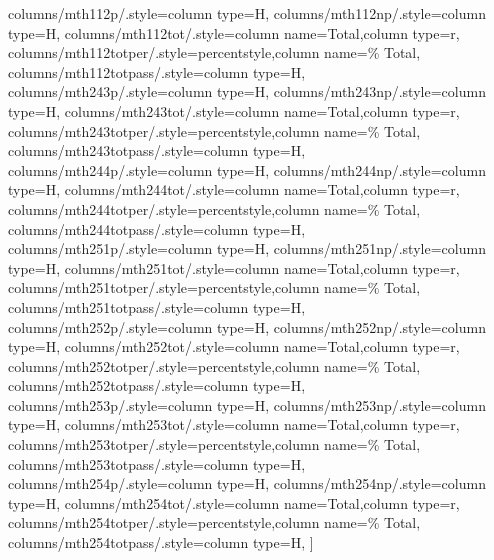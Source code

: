 \documentclass{article}
\begin{document}
{    %
    columns/mth112p/.style={column type=H},
    columns/mth112np/.style={column type=H},
    columns/mth112tot/.style={column name=Total,column type=r},
    columns/mth112totper/.style={percentstyle,column name=\% Total},
    columns/mth112totpass/.style={column type=H},
    columns/mth243p/.style={column type=H},
    columns/mth243np/.style={column type=H},
    columns/mth243tot/.style={column name=Total,column type=r},
    columns/mth243totper/.style={percentstyle,column name=\% Total},
    columns/mth243totpass/.style={column type=H},
    columns/mth244p/.style={column type=H},
    columns/mth244np/.style={column type=H},
    columns/mth244tot/.style={column name=Total,column type=r},
    columns/mth244totper/.style={percentstyle,column name=\% Total},
    columns/mth244totpass/.style={column type=H},
    columns/mth251p/.style={column type=H},
    columns/mth251np/.style={column type=H},
    columns/mth251tot/.style={column name=Total,column type=r},
    columns/mth251totper/.style={percentstyle,column name=\% Total},
    columns/mth251totpass/.style={column type=H},
    columns/mth252p/.style={column type=H},
    columns/mth252np/.style={column type=H},
    columns/mth252tot/.style={column name=Total,column type=r},
    columns/mth252totper/.style={percentstyle,column name=\% Total},
    columns/mth252totpass/.style={column type=H},
    columns/mth253p/.style={column type=H},
    columns/mth253np/.style={column type=H},
    columns/mth253tot/.style={column name=Total,column type=r},
    columns/mth253totper/.style={percentstyle,column name=\% Total},
    columns/mth253totpass/.style={column type=H},
    columns/mth254p/.style={column type=H},
    columns/mth254np/.style={column type=H},
    columns/mth254tot/.style={column name=Total,column type=r},
    columns/mth254totper/.style={percentstyle,column name=\% Total},
    columns/mth254totpass/.style={column type=H},
]{\diversitydata}
}
\end{document}

